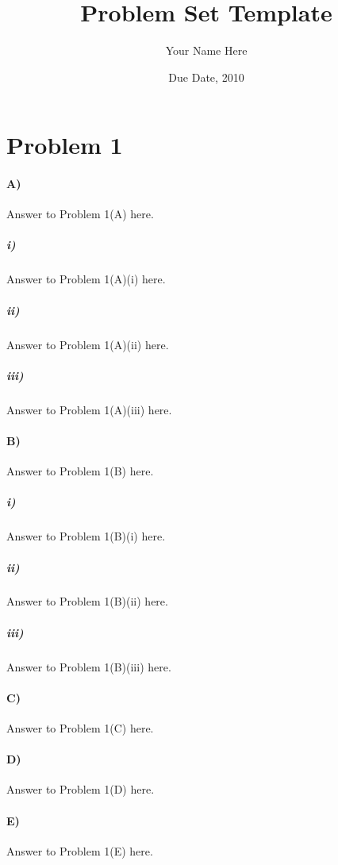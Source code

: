 \documentclass[10pt,letter]{article}
\begin{document}


\title{Problem Set Template}

\author{Your Name Here}

\date{Due Date, 2010}
 
\maketitle 


\section*{Problem 1}

\paragraph{A)} Answer to Problem 1(A) here.

\subparagraph{i)} Answer to Problem 1(A)(i) here.

\subparagraph{ii)} Answer to Problem 1(A)(ii) here.

\subparagraph{iii)} Answer to Problem 1(A)(iii) here.

\paragraph{B)} Answer to Problem 1(B) here.

\subparagraph{i)} Answer to Problem 1(B)(i) here.

\subparagraph{ii)} Answer to Problem 1(B)(ii) here.

\subparagraph{iii)} Answer to Problem 1(B)(iii) here.

\paragraph{C)} Answer to Problem 1(C) here.

\paragraph{D)} Answer to Problem 1(D) here.

\paragraph{E)} Answer to Problem 1(E) here.
\end{document}
